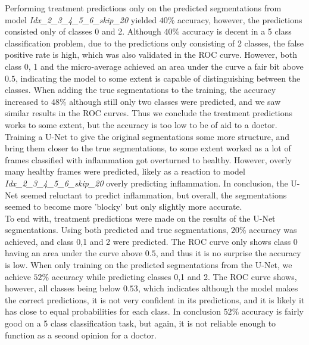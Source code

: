 Performing treatment predictions only on the predicted segmentations from model \textit{Idx\_2\_3\_4\_5\_6\_skip\_20} yielded $40\%$ accuracy, however, the predictions consisted only of classes 0 and 2. Although $40\%$ accuracy is decent in a 5 class classification problem, due to the predictions only consisting of 2 classes, the false positive rate is high, which was also validated in the ROC curve. However, both class 0, 1 and the micro-average achieved an area under the curve a fair bit above $0.5$, indicating the model to some extent is capable of distinguishing between the classes. When adding the true segmentations to the training, the accuracy increased to $48\%$ although still only two classes were predicted, and we saw similar results in the ROC curves. Thus we conclude the treatment predictions works to some extent, but the accuracy is too low to be of aid to a doctor.\\
Training a U-Net to give the original segmentations some more structure, and bring them closer to the true segmentations, to some extent worked as a lot of frames classified with inflammation got overturned to healthy. However, overly many healthy frames were predicted, likely as a reaction to model \textit{Idx\_2\_3\_4\_5\_6\_skip\_20} overly predicting inflammation. In conclusion, the U-Net seemed reluctant to predict inflammation, but overall, the segmentations seemed to become more 'blocky' but only slightly more accurate.\\
To end with, treatment predictions were made on the results of the U-Net segmentations. Using both predicted and true segmentations, $20\%$ accuracy was achieved, and class 0,1 and 2 were predicted. The ROC curve only shows class 0 having an area under the curve above  $0.5$, and thus it is no surprise the accuracy is low. When only training on the predicted segmentations from the U-Net, we achieve $52\%$ accuracy while predicting classes 0,1 and 2. The ROC curve shows, however, all classes being below $0.53$, which indicates although the model makes the correct predictions, it is not very confident in its predictions, and it is likely it has close to equal probabilities for each class. In conclusion $52\%$ accuracy is fairly good on a 5 class classification task, but again, it is not reliable enough to function as a second opinion for a doctor.